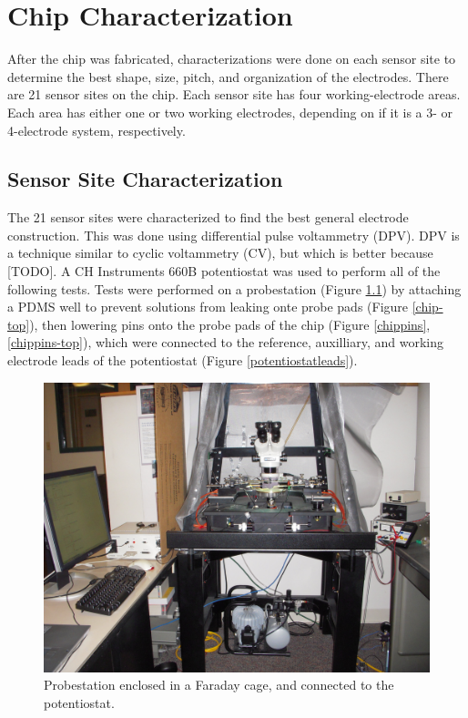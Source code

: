 \chapter{Chip Characterization}

After the chip was fabricated, characterizations were done on each sensor site to determine the best shape, size, pitch, and organization of the electrodes. There are 21 sensor sites on the chip. Each sensor site has four working-electrode areas. Each area has either one or two working electrodes, depending on if it is a 3- or 4-electrode system, respectively.

\section{Sensor Site Characterization}

The 21 sensor sites were characterized to find the best general electrode construction. This was done using differential pulse voltammetry (DPV). DPV is a technique similar to cyclic voltammetry (CV), but which is better because [TODO]. A CH Instruments 660B potentiostat was used to perform all of the following tests. Tests were performed on a probestation (Figure \ref{probestation}) by attaching a PDMS well to prevent solutions from leaking onte probe pads (Figure \ref{chip-top}), then lowering pins onto the probe pads of the chip (Figure \ref{chippins}, \ref{chippins-top}), which were connected to the reference, auxilliary, and working electrode leads of the potentiostat (Figure \ref{potentiostatleads}).

\begin{figure}
	\centering
	\includegraphics[width=\linewidth]{figures/probestation.png}
	\caption[Probestation.]{Probestation enclosed in a Faraday cage, and connected to the potentiostat.}
	\label{probestation}
\end{figure}

